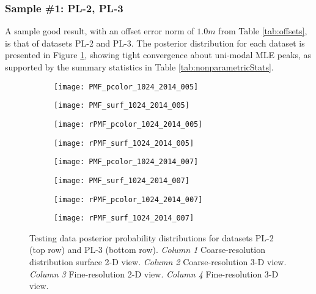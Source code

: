 \subsubsection{Sample \#1: PL-2, PL-3}
\label{rov.Truth.Good1}

A sample good result, with an offset error norm of $1.0m$ from Table \ref{tab:offsets}, is that of datasets PL-2 and PL-3.
The posterior distribution for each dataset is presented in Figure \ref{fig:PLDistributions1}, showing tight convergence about uni-modal MLE peaks, as supported by the summary statistics in Table \ref{tab:nonparametricStats}.

\begin{figure} [h!]	
  	\centering
	\begin{subfigure}[b]{0.24\textwidth}
                \texttt{[image: PMF\_pcolor\_1024\_2014\_005]}
		\caption{}
  	\end{subfigure}
  	\centering
	\begin{subfigure}[b]{0.24\textwidth}
                \texttt{[image: PMF\_surf\_1024\_2014\_005]}
		\caption{}
  	\end{subfigure}
  	\centering
	\begin{subfigure}[b]{0.24\textwidth}
                \texttt{[image: rPMF\_pcolor\_1024\_2014\_005]}
		\caption{}
  	\end{subfigure}
  	\centering
	\begin{subfigure}[b]{0.24\textwidth}
                \texttt{[image: rPMF\_surf\_1024\_2014\_005]}
		\caption{}
  	\end{subfigure}
  		  	
  	\centering
	\begin{subfigure}[b]{0.24\textwidth}
                \texttt{[image: PMF\_pcolor\_1024\_2014\_007]}
		\caption{}
  	\end{subfigure}
  	\centering
	\begin{subfigure}[b]{0.24\textwidth}
                \texttt{[image: PMF\_surf\_1024\_2014\_007]}
		\caption{}
  	\end{subfigure}
  	\centering
	\begin{subfigure}[b]{0.24\textwidth}
                \texttt{[image: rPMF\_pcolor\_1024\_2014\_007]}
		\caption{}
  	\end{subfigure}
  	\centering
	\begin{subfigure}[b]{0.24\textwidth}
                \texttt{[image: rPMF\_surf\_1024\_2014\_007]}
		\caption{}
  	\end{subfigure}
  	
	\caption{Testing data posterior probability distributions for datasets PL-2 (top row) and PL-3 (bottom row). \emph{Column 1} Coarse-resolution distribution surface 2-D view. \emph{Column 2} Coarse-resolution 3-D view. \emph{Column 3} Fine-resolution 2-D view. \emph{Column 4} Fine-resolution 3-D view. }
	\label{fig:PLDistributions1}
\end{figure}


